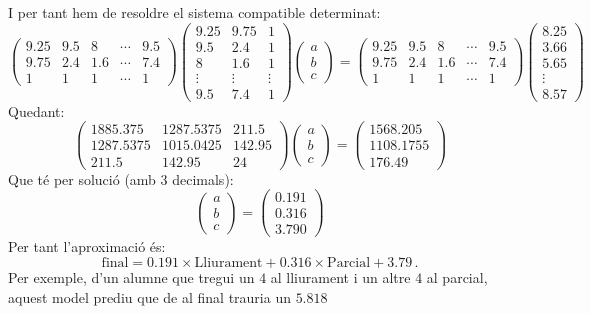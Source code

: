 \begin{exemple}
\[\]
I per tant hem de resoldre el sistema compatible determinat:
\[
\begin{pmatrix}
9.25 & 9.5 & 8 & \cdots & 9.5 \\
9.75 & 2.4 & 1.6 & \cdots & 7.4 \\
1 & 1 & 1 & \cdots & 1
\end{pmatrix}
\begin{pmatrix}
9.25 & 9.75 & 1 \\
9.5 & 2.4 & 1 \\
8 & 1.6 & 1 \\
\vdots & \vdots & \vdots \\
9.5 & 7.4 & 1
\end{pmatrix}
\begin{pmatrix} a \\ b \\ c \end{pmatrix}=
\begin{pmatrix}
9.25 & 9.5 & 8 & \cdots & 9.5 \\
9.75 & 2.4 & 1.6 & \cdots & 7.4 \\
1 & 1 & 1 & \cdots & 1
\end{pmatrix}
\begin{pmatrix} 8.25 \\ 3.66 \\ 5.65 \\ \vdots \\ 8.57 \end{pmatrix}
\]
Quedant:
\[
\left(\begin{array}{ccc}
1885.375 & 1287.5375 & 211.5 \\
1287.5375 & 1015.0425 & 142.95 \\
211.5 & 142.95 & 24
\end{array}\right)
\begin{pmatrix} a \\ b \\ c \end{pmatrix}=
\begin{pmatrix}
1568.205 \\ 1108.1755 \\ 176.49
\end{pmatrix}
\]
Que té per solució (amb 3 decimals):
\[
\begin{pmatrix} a \\ b \\ c \end{pmatrix}=
\begin{pmatrix} 0.191 \\
0.316 \\
3.790 \end{pmatrix}
\]
Per tant l'aproximació és:
\[
\text{final} = 0.191 \times \text{Lliurament} + 0.316 \times \text{Parcial} + 3.79\, .
\]
Per exemple, d'un alumne que tregui un $4$ al lliurament i un altre $4$ al parcial, aquest model prediu que de al final trauria un $5.818$
\end{exemple}


